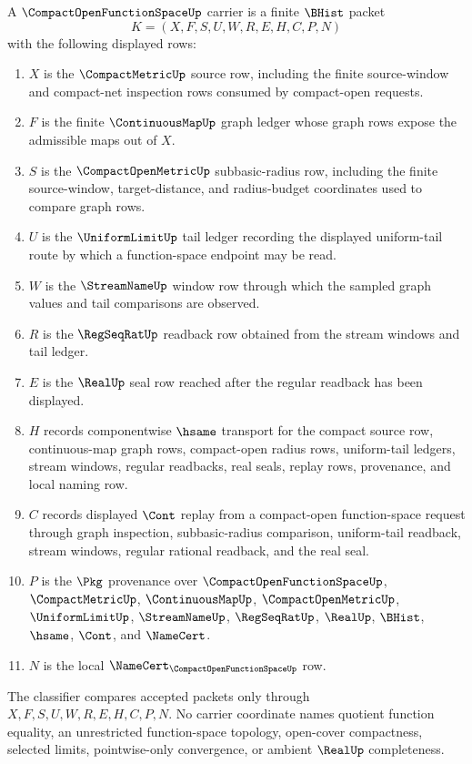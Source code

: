\begin{definition}
\label{def:compact-open-function-space-carrier}
A $\CompactOpenFunctionSpaceUp$ carrier is a finite $\BHist$ packet
$$
K=(X,F,S,U,W,R,E,H,C,P,N)
$$
with the following displayed rows:
\begin{enumerate}
\item $X$ is the $\CompactMetricUp$ source row, including the finite source-window and compact-net inspection rows consumed by compact-open requests.
\item $F$ is the finite $\ContinuousMapUp$ graph ledger whose graph rows expose the admissible maps out of $X$.
\item $S$ is the $\CompactOpenMetricUp$ subbasic-radius row, including the finite source-window, target-distance, and radius-budget coordinates used to compare graph rows.
\item $U$ is the $\UniformLimitUp$ tail ledger recording the displayed uniform-tail route by which a function-space endpoint may be read.
\item $W$ is the $\StreamNameUp$ window row through which the sampled graph values and tail comparisons are observed.
\item $R$ is the $\RegSeqRatUp$ readback row obtained from the stream windows and tail ledger.
\item $E$ is the $\RealUp$ seal row reached after the regular readback has been displayed.
\item $H$ records componentwise $\hsame$ transport for the compact source row, continuous-map graph rows, compact-open radius rows, uniform-tail ledgers, stream windows, regular readbacks, real seals, replay rows, provenance, and local naming row.
\item $C$ records displayed $\Cont$ replay from a compact-open function-space request through graph inspection, subbasic-radius comparison, uniform-tail readback, stream windows, regular rational readback, and the real seal.
\item $P$ is the $\Pkg$ provenance over $\CompactOpenFunctionSpaceUp$, $\CompactMetricUp$, $\ContinuousMapUp$, $\CompactOpenMetricUp$, $\UniformLimitUp$, $\StreamNameUp$, $\RegSeqRatUp$, $\RealUp$, $\BHist$, $\hsame$, $\Cont$, and $\NameCert$.
\item $N$ is the local $\NameCert_{\CompactOpenFunctionSpaceUp}$ row.
\end{enumerate}
The classifier compares accepted packets only through $X,F,S,U,W,R,E,H,C,P,N$. No carrier coordinate names quotient function equality, an unrestricted function-space topology, open-cover compactness, selected limits, pointwise-only convergence, or ambient $\RealUp$ completeness.
\end{definition}


